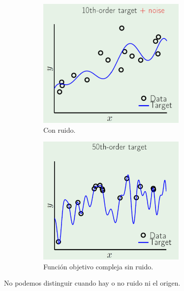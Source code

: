 \documentclass[11pt,a4paper]{article}
\theoremstyle{definition}
\begin{document}
	\begin{figure}[H]
		\centering
		\begin{subfigure}{.5\textwidth}
  		\centering
  		\includegraphics[width=0.8\textwidth]{images/with_added_noise}
  		\caption{Con ruido.}
  		\label{fig:sub1}
		\end{subfigure}%
		\begin{subfigure}{.5\textwidth}
  		\centering
  		\includegraphics[width=0.8\textwidth]{images/noiseless}
  		\caption{Función objetivo compleja sin ruido.}
  		\label{fig:sub2}
		\end{subfigure}
		\caption{}
		\label{fig:test}
	\end{figure}
	
	No podemos distinguir cuando hay o no ruido ni el origen.\\
	
\end{document}
